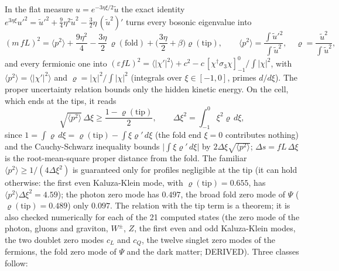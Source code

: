\documentclass[
  10pt,
]{article}
\begin{document}
In the flat measure \(u = e^{-3\eta\xi/2}\tilde u\) the exact identity
\(e^{3\eta\xi}u'^2 = \tilde u'^2 + \tfrac94\eta^2\tilde u^2 - \tfrac32\eta\,(\tilde u^2)'\)
turns every bosonic eigenvalue into
\[ (m\,fL)^2 = \langle p^2\rangle + \frac{9\eta^2}{4} - \frac{3\eta}{2}\,\varrho(\text{fold}) + \Big(\frac{3\eta}{2} + \beta\Big)\varrho(\text{tip}),
   \qquad \langle p^2\rangle = \frac{\int\tilde u'^2}{\int\tilde u^2},\quad \varrho = \frac{\tilde u^2}{\int\tilde u^2}, \]
and every fermionic one into
\((\varepsilon fL)^2 = \langle|\chi'|^2\rangle + c^2 - c\,[\chi^\dagger\sigma_3\chi]_{-1}^{0}/\!\int|\chi|^2\),
with \(\langle p^2\rangle = \langle|\chi'|^2\rangle\) and
\(\varrho = |\chi|^2/\!\int|\chi|^2\) (integrals over
\(\xi \in [-1, 0]\), primes \(d/d\xi\)). The proper uncertainty relation
bounds only the hidden kinetic energy. On the cell, which ends at the
tips, it reads
\[ \sqrt{\langle p^2\rangle}\,\Delta\xi \ge \frac{1 - \varrho(\text{tip})}{2},\qquad \Delta\xi^2 = \int_{-1}^{0}\xi^2\varrho\,d\xi , \]
since
\(1 = \int\varrho\,d\xi = \varrho(\text{tip}) - \int\xi\varrho'\,d\xi\)
(the fold end \(\xi = 0\) contributes nothing) and the Cauchy-Schwarz
inequality bounds \(\lvert\int\xi\varrho'\,d\xi\rvert\) by
\(2\Delta\xi\sqrt{\langle p^2\rangle}\); \(\Delta s = fL\,\Delta\xi\) is
the root-mean-square proper distance from the fold. The familiar
\(\langle p^2\rangle \ge 1/(4\Delta\xi^2)\) is guaranteed only for
profiles negligible at the tip (it can hold otherwise: the first even
Kaluza-Klein mode, with \(\varrho(\text{tip}) = 0.655\), has
\(\langle p^2\rangle\Delta\xi^2 = 4.59\)); the photon zero mode has
\(0.497\), the broad fold zero mode of \(\Psi\)
(\(\varrho(\text{tip}) = 0.489\)) only \(0.097\). The relation with the
tip term is a theorem; it is also checked numerically for each of the 21
computed states (the zero mode of the photon, gluons and graviton,
\(W^\pm\), \(Z\), the first even and odd Kaluza-Klein modes, the two
doublet zero modes \(c_L\) and \(c_Q\), the twelve singlet zero modes of
the fermions, the fold zero mode of \(\Psi\) and the dark matter;
DERIVED). Three classes follow:
\end{document}
